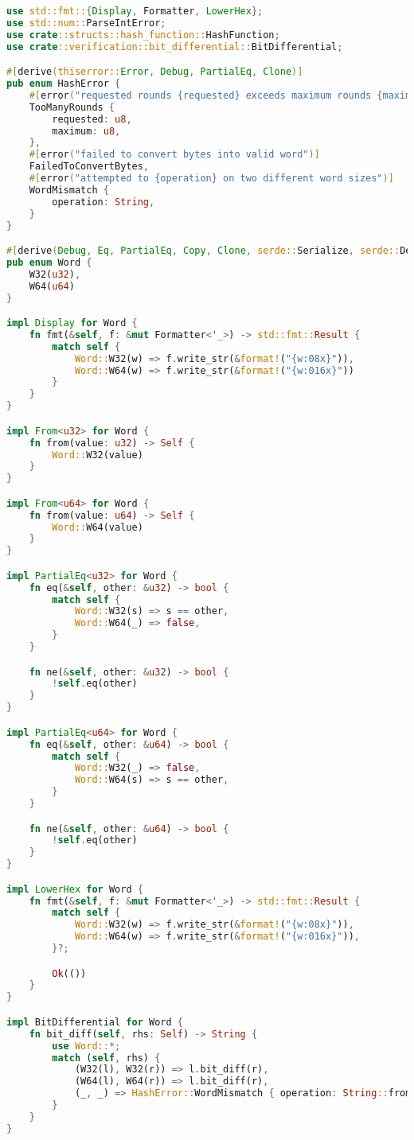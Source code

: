 \begin{lstlisting}[language=rust, caption={sha/structs.rs}]
use std::fmt::{Display, Formatter, LowerHex};
use std::num::ParseIntError;
use crate::structs::hash_function::HashFunction;
use crate::verification::bit_differential::BitDifferential;

#[derive(thiserror::Error, Debug, PartialEq, Clone)]
pub enum HashError {
	#[error("requested rounds {requested} exceeds maximum rounds {maximum} for hash function")]
	TooManyRounds {
		requested: u8,
		maximum: u8,
	},
	#[error("failed to convert bytes into valid word")]
	FailedToConvertBytes,
	#[error("attempted to {operation} on two different word sizes")]
	WordMismatch {
		operation: String,
	}
}

#[derive(Debug, Eq, PartialEq, Copy, Clone, serde::Serialize, serde::Deserialize)]
pub enum Word {
	W32(u32),
	W64(u64)
}

impl Display for Word {
	fn fmt(&self, f: &mut Formatter<'_>) -> std::fmt::Result {
		match self {
			Word::W32(w) => f.write_str(&format!("{w:08x}")),
			Word::W64(w) => f.write_str(&format!("{w:016x}"))
		}
	}
}

impl From<u32> for Word {
	fn from(value: u32) -> Self {
		Word::W32(value)
	}
}

impl From<u64> for Word {
	fn from(value: u64) -> Self {
		Word::W64(value)
	}
}

impl PartialEq<u32> for Word {
	fn eq(&self, other: &u32) -> bool {
		match self {
			Word::W32(s) => s == other,
			Word::W64(_) => false,
		}
	}

	fn ne(&self, other: &u32) -> bool {
		!self.eq(other)
	}
}

impl PartialEq<u64> for Word {
	fn eq(&self, other: &u64) -> bool {
		match self {
			Word::W32(_) => false,
			Word::W64(s) => s == other,
		}
	}

	fn ne(&self, other: &u64) -> bool {
		!self.eq(other)
	}
}

impl LowerHex for Word {
	fn fmt(&self, f: &mut Formatter<'_>) -> std::fmt::Result {
		match self {
			Word::W32(w) => f.write_str(&format!("{w:08x}")),
			Word::W64(w) => f.write_str(&format!("{w:016x}")),
		}?;

		Ok(())
	}
}

impl BitDifferential for Word {
	fn bit_diff(self, rhs: Self) -> String {
		use Word::*;
		match (self, rhs) {
			(W32(l), W32(r)) => l.bit_diff(r),
			(W64(l), W64(r)) => l.bit_diff(r),
			(_, _) => HashError::WordMismatch { operation: String::from("bit diff") }.to_string(),
		}
	}
}


\end{lstlisting}
